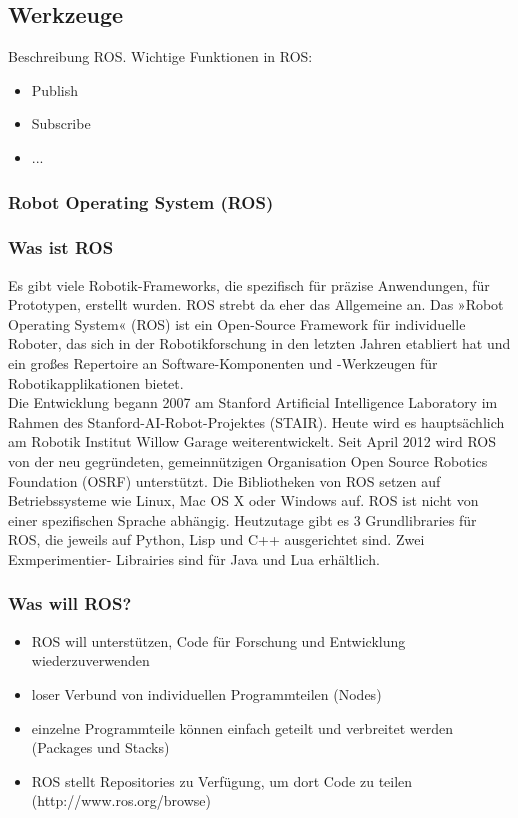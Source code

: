 \subsection{Werkzeuge}
Beschreibung ROS. 
Wichtige Funktionen in ROS:
\begin{itemize}
\item Publish
\item Subscribe
\item ...
\end{itemize}
\subsubsection{Robot Operating System (ROS)}

\subsubsection{Was ist ROS}
Es gibt viele Robotik-Frameworks, die spezifisch für präzise Anwendungen, für Prototypen,
erstellt wurden. ROS strebt da eher das Allgemeine an. Das »Robot Operating System«
(ROS) ist ein Open-Source Framework für individuelle Roboter, das sich in der
Robotikforschung in den letzten Jahren etabliert hat und ein großes Repertoire an Software-Komponenten und -Werkzeugen für Robotikapplikationen bietet.\\
Die Entwicklung begann 2007 am Stanford Artificial Intelligence Laboratory im Rahmen des
Stanford-AI-Robot-Projektes (STAIR). Heute wird es hauptsächlich am Robotik Institut Willow
Garage weiterentwickelt. Seit April 2012 wird ROS von der neu gegründeten,
gemeinnützigen Organisation Open Source Robotics Foundation (OSRF) unterstützt. Die
Bibliotheken von ROS setzen auf Betriebssysteme wie Linux, Mac OS X oder Windows auf.
ROS ist nicht von einer spezifischen Sprache abhängig. Heutzutage gibt es 3 Grundlibraries
für ROS, die jeweils auf Python, Lisp und C++ ausgerichtet sind. Zwei Exmperimentier-
Librairies sind für Java und Lua erhältlich.
\subsubsection{Was will ROS?}
\begin{itemize}
 \item ROS will unterstützen, Code für Forschung und Entwicklung wiederzuverwenden
 \item loser Verbund von individuellen Programmteilen (Nodes)
 \item einzelne Programmteile können einfach geteilt und verbreitet werden (Packages und Stacks)
 \item ROS stellt Repositories zu Verfügung, um dort Code zu teilen \cite{ROS:2014:Online}
(http://www.ros.org/browse)
\end{itemize}

